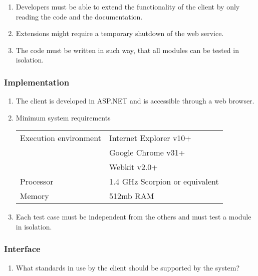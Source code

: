 \begin{enumerate}[label=NFR-\twodigits*, resume]
\item Developers must be able to extend the functionality of the client by only reading the code and the documentation.
\item Extensions might require a temporary shutdown of the web service.
\item The code must be written in such way, that all modules can be tested in isolation.
\end{enumerate}

\subsubsection{Implementation}
\begin{enumerate}[label=NFR-\twodigits*, resume]
\item The client is developed in ASP.NET and is accessible through a web browser.
\item Minimum system requirements


\begin{tabular}{| l | l | }
\hline
 Execution environment & Internet Explorer v10+\\
& Google Chrome v31+\\
& Webkit v2.0+\\ \hline
 Processor & 1.4 GHz Scorpion or equivalent \\ \hline
 Memory & 512mb RAM  \\ \hline

\end{tabular}

\item Each test case must be independent from the others and must test a module in isolation.
\end{enumerate}

\subsubsection{Interface}

\begin{enumerate}[label=NFR-\twodigits*, resume]
\item {\color{red}What standards in use by the client should be supported by the system?}
\end{enumerate}

%
